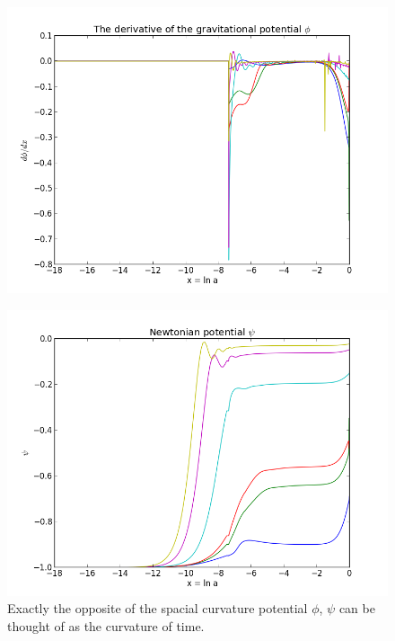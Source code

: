 \documentclass[norsk,a4paper,12pt]{article}
\begin{document}
\begin{figure}[H] 
\begin{center} 
\includegraphics[scale=0.5]{dphi.png} 
 

 
\caption{} 
\end{center} 
\end{figure}

\begin{figure}[H] 
\begin{center} 
\includegraphics[scale=0.5]{psi.png} 
 

\caption{Exactly the opposite of the spacial curvature potential $\phi$, $\psi$ can be thought of as the curvature of time.} 
\end{center} 
\end{figure}
\end{document}
